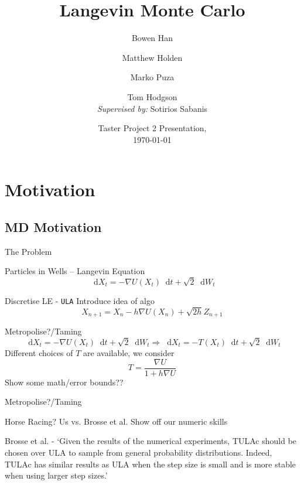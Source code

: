 \documentclass[aspectratio=169]{beamer}
\title{Langevin Monte Carlo}
\author{Bowen Han\inst{1} \and Matthew Holden\inst{1} \and Marko Puza\inst{1} \and Tom Hodgson\inst{1}\\ \textit{Supervised by:} Sotirios Sabanis\inst{2}}
\institute[Universities of Somewhere and Elsewhere] %
{
  \inst{1}%
    The Maxwell Institute Graduate School in Analysis \& its Applications
  \and
  \inst{2}%
  University of Edinburgh
}
\date{ Taster Project 2 Presentation,\\ \today}
\newcommand{\dif}{\mathop{}\!\mathrm{d}}
\newcommand{\grad}{\nabla}
\begin{document}
\begin{frame}
  \titlepage
\end{frame}


\section{Motivation}


\subsection{MD Motivation}

\begin{frame}{The Problem}
    
\end{frame}

\begin{frame}{Particles in Wells -- Langevin Equation}
     \[\dif X_t = -\grad U(X_t) \dif t +\sqrt{2}\dif W_t\]
\end{frame}

\begin{frame}{Discretise LE - \texttt{ULA}}
    Introduce idea of algo
     \[X_{n+1} = X_n - h\grad U(X_n)  + \sqrt{2h}Z_{n+1}\]
\end{frame}
\begin{frame}{Metropolise?/Taming}
\[\dif X_t = -\grad U(X_t) \dif t +\sqrt{2}\dif W_t \Longrightarrow \dif X_t = -T(X_t)\dif t +\sqrt{2}\dif W_t \]
Different choices of \(T\) are available, we consider 
\[T=\frac{\grad U }{1+h\grad U}\]
    Show some math/error bounds??
\end{frame}

\begin{frame}{Metropolise?/Taming}
    
\end{frame}

\begin{frame}{Horse Racing? Us vs. Brosse et al.}
    Show off our numeric skills
    
    Brosse et al. - `Given the results of the numerical experiments, TULAc should be chosen over ULA
to sample from general probability distributions. Indeed, TULAc has similar results as
ULA when the step size is small and is more stable when using larger step sizes.'
\end{frame}
\end{document}
